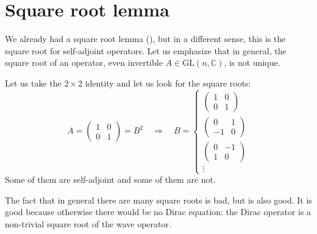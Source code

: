 \documentclass[../main.tex]{subfiles}
\begin{document}
\section{Square root lemma}
We already had a square root lemma (), but in a different sense, this is the square root for self-adjoint operators. Let us emphasize that in general, the square root of an operator, even invertible $A\in\textrm{GL}(n,\mathbb{C})$, is not unique.
\begin{example}
Let us take the $2\times 2$ identity and let us look for the square roots:
\[
A=\begin{pmatrix}
1 & 0\\
0 & 1
\end{pmatrix}=B^2 \quad \Rightarrow \quad B=\begin{cases}
\begin{pmatrix}
1 & 0\\
0 & 1
\end{pmatrix}\\
\begin{pmatrix}
0 & 1\\
-1 & 0
\end{pmatrix}\\
\begin{pmatrix}
0 & -1\\
1 & 0
\end{pmatrix}\\
\vdots
\end{cases}
\]
Some of them are self-adjoint and some of them are not.
\end{example}
The fact that in general there are many square roots is bad, but is also good. It is good because otherwise there would be no Dirac equation: the Dirac operator is a non-trivial square root of the wave operator.
\end{document}
